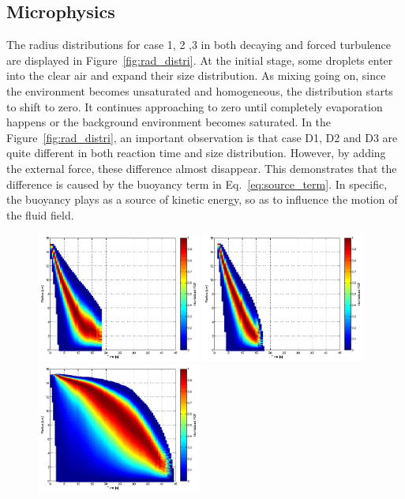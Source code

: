 \documentclass[draft,jgrga]{AGUTeX}
\newcommand{\Eq}[1]{Eq.~\eqref{#1}} \newcommand{\Fig}[1]{Figure~\ref{#1}}
\begin{document}
\begin{article}
\subsection{Microphysics}
The radius distributions for case 1, 2 ,3 in both decaying and forced turbulence are displayed in \Fig{fig:rad_distri}. At the initial stage, some droplets enter into the clear air and expand their size distribution. As mixing going on, since the environment becomes unsaturated and homogeneous, the distribution starts to shift to zero. It continues approaching to zero until completely evaporation happens or the background environment becomes saturated. 
In the \Fig{fig:rad_distri}, an important observation is that case D1, D2 and D3 are quite different in both reaction time and size distribution. However, by adding the external force, these difference almost disappear. This demonstrates that the difference is caused by the buoyancy term in \Eq{eq:source_term}. In specific, the buoyancy plays as a source of kinetic energy, so as to influence the motion of the fluid field.
\begin{figure}[H]\centering
\includegraphics[width=0.48\textwidth]{Figures/pdf_radius_d1}
\includegraphics[width=0.48\textwidth]{Figures/pdf_radius_f1}\\
\includegraphics[width=0.48\textwidth]{Figures/pdf_radius_d2}

\end{figure}
\end{article}
\end{document}
